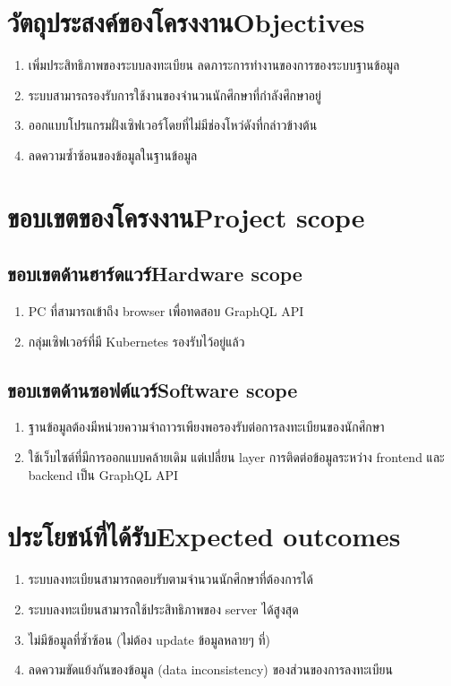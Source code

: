 \section{\ifcpe วัตถุประสงค์ของโครงงาน\else Objectives\fi}
\begin{enumerate}
    \item เพิ่มประสิทธิภาพของระบบลงทะเบียน ลดภาระการทำงานของการของระบบฐานข้อมูล
    \item ระบบสามารถรองรับการใช้งานของจำนวนนักศึกษาที่กำลังศึกษาอยู่
    \item ออกแบบโปรแกรมฝั่งเซิฟเวอร์โดยที่ไม่มีช่องโหว่ดังที่กล่าวข้างต้น
    \item ลดความซ้ำซ้อนของข้อมูลในฐานข้อมูล
\end{enumerate}

\section{\ifcpe ขอบเขตของโครงงาน\else Project scope\fi}

\subsection{\ifcpe ขอบเขตด้านฮาร์ดแวร์\else Hardware scope\fi}
\begin{enumerate}
    \item PC ที่สามารถเข้าถึง browser เพื่อทดสอบ GraphQL API
    \item กลุ่มเซิฟเวอร์ที่มี Kubernetes รองรับไว้อยู่แล้ว
\end{enumerate}
\subsection{\ifcpe ขอบเขตด้านซอฟต์แวร์\else Software scope\fi}
\begin{enumerate}
    \item ฐานข้อมูลต้องมีหน่วยความจำถาวรเพียงพอรองรับต่อการลงทะเบียนของนักศึกษา
    \item ใช้เว็บไซต์ที่มีการออกแบบคล้ายเดิม แต่เปลี่ยน layer การติดต่อข้อมูลระหว่าง frontend และ backend เป็น GraphQL API \cite{graphql}
\end{enumerate}
\section{\ifcpe ประโยชน์ที่ได้รับ\else Expected outcomes\fi}
\begin{enumerate}
    \item ระบบลงทะเบียนสามารถตอบรับตามจำนวนนักศึกษาที่ต้องการได้
    \item ระบบลงทะเบียนสามารถใช้ประสิทธิภาพของ server ได้สูงสุด
    \item ไม่มีข้อมูลที่ซ้ำซ้อน (ไม่ต้อง update ข้อมูลหลายๆ ที่)
    \item ลดความขัดแย้งกันของข้อมูล (data inconsistency) ของส่วนของการลงทะเบียน
\end{enumerate}

